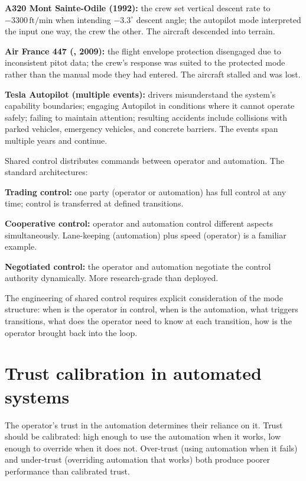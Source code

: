 \textbf{A320 Mont Sainte-Odile (1992):} the crew set vertical descent rate to $-3300\,\text{ft/min}$ when intending $-3.3^\circ$ descent angle; the autopilot mode interpreted the input one way, the crew the other. The aircraft descended into terrain.

\textbf{Air France 447 (\cite{acc:bea-af447}, 2009):} the flight envelope protection disengaged due to inconsistent pitot data; the crew's response was suited to the protected mode rather than the manual mode they had entered. The aircraft stalled and was lost.

\textbf{Tesla Autopilot (multiple events):} drivers misunderstand the system's capability boundaries; engaging Autopilot in conditions where it cannot operate safely; failing to maintain attention; resulting accidents include collisions with parked vehicles, emergency vehicles, and concrete barriers. The events span multiple years and continue.

Shared control distributes commands between operator and automation. The standard architectures:

\textbf{Trading control:} one party (operator or automation) has full control at any time; control is transferred at defined transitions.

\textbf{Cooperative control:} operator and automation control different aspects simultaneously. Lane-keeping (automation) plus speed (operator) is a familiar example.

\textbf{Negotiated control:} the operator and automation negotiate the control authority dynamically. More research-grade than deployed.

The engineering of shared control requires explicit consideration of the mode structure: when is the operator in control, when is the automation, what triggers transitions, what does the operator need to know at each transition, how is the operator brought back into the loop.

\section{Trust calibration in automated systems}

The operator's trust in the automation determines their reliance on it. Trust should be calibrated: high enough to use the automation when it works, low enough to override when it does not. Over-trust (using automation when it fails) and under-trust (overriding automation that works) both produce poorer performance than calibrated trust.

